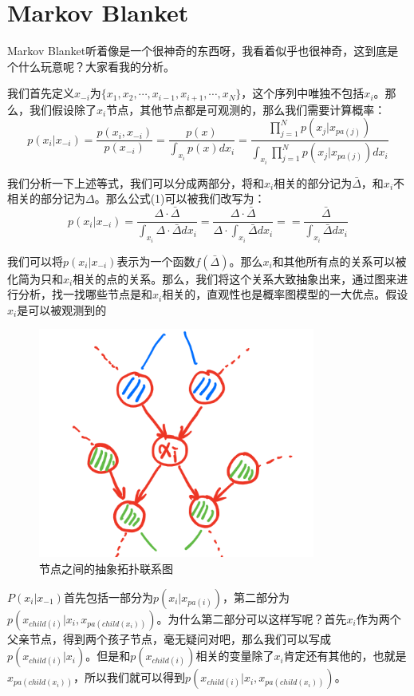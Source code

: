 \documentclass[a4paper]{article}
\begin{document}
\section{Markov Blanket}
Markov Blanket听着像是一个很神奇的东西呀，我看着似乎也很神奇，这到底是个什么玩意呢？大家看我的分析。

我们首先定义$x_{-i}$为$\{x_1,x_2,\cdots,x_{i-1},x_{i+1},\cdots,x_N\}$，这个序列中唯独不包括$x_i$。那么，我们假设除了$x_i$节点，其他节点都是可观测的，那么我们需要计算概率：
\begin{equation}
    p(x_i|x_{-i}) = \frac{p(x_i, x_{-i})}{p(x_{-i})} = \frac{p(x)}{\int_{x_i}p(x)dx_i} = \frac{\prod_{j=1}^N p(x_j|x_{pa(j)})}{\int_{x_i}\prod_{j=1}^N p(x_j|x_{pa(j)})dx_i}
\end{equation}

我们分析一下上述等式，我们可以分成两部分，将和$x_i$相关的部分记为$\bar{\Delta}$，和$x_i$不相关的部分记为$\Delta$。那么公式(1)可以被我们改写为：
\begin{equation}
     p(x_i|x_{-i})= \frac{\Delta\cdot \bar{\Delta}}{\int_{x_i}\Delta\cdot \bar{\Delta}dx_i} = \frac{\Delta\cdot \bar{\Delta}}{\Delta\cdot \int_{x_i} \bar{\Delta}dx_i} = = \frac{ \bar{\Delta}}{ \int_{x_i} \bar{\Delta}dx_i}
\end{equation}

我们可以将$p(x_i|x_{-i})$表示为一个函数$f(\bar{\Delta})$。那么$x_i$和其他所有点的关系可以被化简为只和$x_i$相关的点的关系。那么，我们将这个关系大致抽象出来，通过图来进行分析，找一找哪些节点是和$x_i$相关的，直观性也是概率图模型的一大优点。假设$x_i$是可以被观测到的
\begin{figure}[H]
    \centering
    \includegraphics[width=.55\textwidth]{微信图片_20191125153322.png}
    \caption{节点之间的抽象拓扑联系图}
    \label{fig:my_label_1}
\end{figure}

$P(x_i|x_{-1})$首先包括一部分为$p(x_i|x_{pa(i)})$，第二部分为$p(x_{child(i)}|x_i,x_{pa(child(x_i))})$。为什么第二部分可以这样写呢？首先$x_i$作为两个父亲节点，得到两个孩子节点，毫无疑问对吧，那么我们可以写成$p(x_{child(i)}|x_i)$。但是和$p(x_{child(i)})$相关的变量除了$x_i$肯定还有其他的，也就是$x_{pa(child(x_i))}$，所以我们就可以得到$p(x_{child(i)}|x_i,x_{pa(child(x_i))})$。
\end{document}
